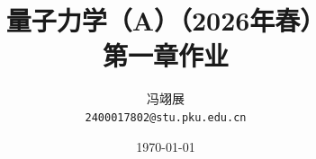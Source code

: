 \title{\textbf{量子力学（A）（2026年春）} \\[0.5em]
    \Large 第一章作业}
\author{冯翊展 \\ 
    \normalsize{\texttt{2400017802@stu.pku.edu.cn}}}
\date{\today}